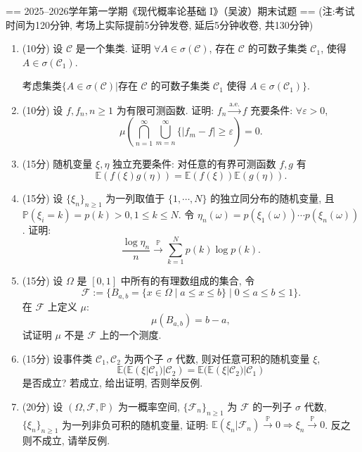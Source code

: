
== 2025--2026学年第一学期《现代概率论基础 I》（吴波）期末试题 ==
(注:考试时间为120分钟, 考场上实际提前5分钟发卷, 延后5分钟收卷, 共130分钟)
\begin{enumerate}
    \item (10分) 设 $\mathscr{C}$ 是一个集类. 证明 $\forall A \in \sigma(\mathscr{C})$, 存在 $\mathscr{C}$ 的可数子集类 $\mathscr{C}_1$, 使得 $A \in \sigma(\mathscr{C}_1)$.

    \begin{proofc}[提示]
    考虑集类$\{A\in \sigma(\mathscr{C})|\text{存在 } \mathscr{C} \text{ 的可数子集类 } \mathscr{C}_1 \text{ 使得 } A \in \sigma(\mathscr{C}_1)\}$.
    \end{proofc}

    \item (10分) 设 $f, f_n, n \geq 1$ 为有限可测函数. 证明: $f_n \xrightarrow{\text{a.e.}} f$ 充要条件: 
    $\forall \varepsilon > 0$, $$\mu\left(\bigcap_{n=1}^\infty \bigcup_{m=n}^\infty \{ \left\lvert f_m - f\right\rvert \geq \varepsilon \right)=0.$$
    \item (15分) 随机变量 $\xi, \eta$ 独立充要条件: 对任意的有界可测函数 $f, g$ 有 $$\mathbb{E} \left(f(\xi)g(\eta)\right) = \mathbb{E}(f(\xi))\mathbb{E}(g(\eta)).$$
    \item (15分) 设 $\{\xi_n\}_{n\geq 1}$ 为一列取值于 $\{1, \cdots, N\}$ 的独立同分布的随机变量, 且 $\mathbb{P}(\xi_i = k) = p(k) > 0, 1 \leq k \leq N$. 
    令 $\eta_n(\omega) = p(\xi_1(\omega))\cdots p(\xi_n(\omega))$. 
    证明: $$\frac{\log \eta_n}{n} \stackrel{\mathbb{P}}{\longrightarrow} \sum_{k=1}^N p(k) \log p(k).$$
    \item (15分) 设 $\Omega$ 是 $[0,1]$ 中所有的有理数组成的集合, 令 $$\mathscr{F} := \{B_{a,b} = \{x\in \Omega \mid a \leq x \leq b\} \mid 0 \leq a \leq b \leq 1\}.$$ 
    在 $\mathscr{F}$ 上定义 $\mu$: $$\mu(B_{a,b}) = b - a,$$ 试证明 $\mu$ 不是 $\mathscr{F}$ 上的一个测度.
    \item (15分) 设事件类 $\mathscr{C}_1, \mathscr{C}_2$ 为两个子 $\sigma$ 代数, 则对任意可积的随机变量 $\xi$, 
    $$\mathbb{E}(\mathbb{E}(\xi | \mathscr{C}_1) | \mathscr{C}_2) = \mathbb{E}(\mathbb{E}(\xi | \mathscr{C}_2) | \mathscr{C}_1)$$ 是否成立? 若成立, 给出证明, 否则举反例.
    \item (20分) 设 $(\Omega, \mathscr{F}, \mathbb{P})$ 为一概率空间, $\{\mathscr{F}_n\}_{n \geq 1}$ 为 $\mathscr{F}$ 的一列子 $\sigma$ 代数, $\{\xi_n\}_{n \geq 1}$ 为一列非负可积的随机变量, 
    证明: $\mathbb{E}(\xi_n | \mathscr{F}_n) \stackrel{\mathbb{P}}{\longrightarrow} 0 \Rightarrow \xi_n \stackrel{\mathbb{P}}{\longrightarrow} 0$. 反之则不成立, 请举反例. 
    

\end{enumerate}
